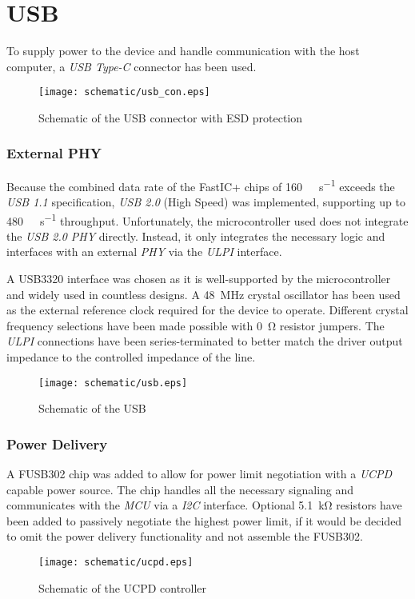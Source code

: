 \section{USB}
To supply power to the device and handle communication with the host computer, a \emph{USB Type-C} connector has been used.
\FloatBarrier
\begin{figure}[htp!]
    \centering
    \texttt{[image: schematic/usb\_con.eps]}
    \caption{Schematic of the USB connector with ESD protection}
    \label{fig:schem_usb_con}
\end{figure}
\FloatBarrier
\subsubsection{External PHY}
Because the combined data rate of the FastIC+ chips of \SI{160}{\mega\bit\per\second} exceeds the \emph{USB 1.1} specification\cite{usb11_spec}, \emph{USB 2.0} (High Speed) was implemented, supporting up to \SI{480}{\mega\bit\per\second} throughput. \cite{usb20_spec} Unfortunately, the microcontroller used does not integrate the \emph{USB 2.0 PHY} directly. Instead, it only integrates the necessary logic and interfaces with an external \emph{PHY} via the \emph{ULPI} interface. \cite{stm32h753xih6_datasheet}

A USB3320 interface was chosen as it is well-supported by the microcontroller and widely used in countless designs. A \SI{48}{\mega\hertz} crystal oscillator has been used as the external reference clock required for the device to operate. Different crystal frequency selections have been made possible with \SI{0}{\ohm} resistor jumpers. The \emph{ULPI} connections have been series-terminated to better match the driver output impedance to the controlled impedance of the line. \cite{usb3320_datasheet}
\FloatBarrier
\begin{figure}[htp!]
    \centering
    \texttt{[image: schematic/usb.eps]}
    \caption{Schematic of the USB}
    \label{fig:schem_usb}
\end{figure}
\FloatBarrier
\subsubsection{Power Delivery}
A FUSB302 chip was added to allow for power limit negotiation with a \emph{UCPD} capable power source. The chip handles all the necessary signaling and communicates with the \emph{MCU} via a \emph{I2C} interface. \cite{fusb302b_datasheet} Optional \SI{5.1}{\kilo\ohm} resistors have been added to passively negotiate the highest power limit, if it would be decided to omit the power delivery functionality and not assemble the FUSB302.
\FloatBarrier
\begin{figure}[htp!]
    \centering
    \texttt{[image: schematic/ucpd.eps]}
    \caption{Schematic of the UCPD controller}
    \label{fig:schem_ucpd}
\end{figure}
\FloatBarrier
